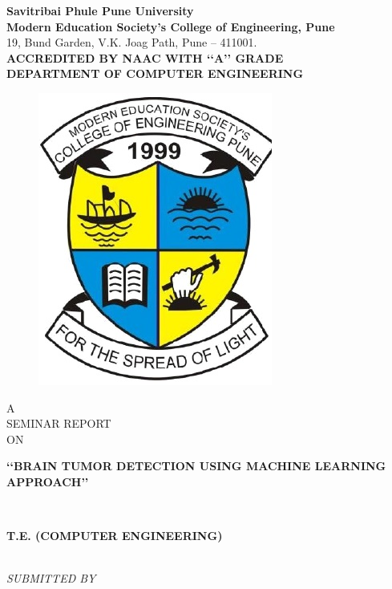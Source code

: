 \documentclass[a4paper, 12pt]{report}
\begin{document}
\newenvironment{frontmatter}{}{}
\begin{frontmatter}
\begin{titlepage}
\begin{center}
\textup{\large  \textbf{Savitribai Phule Pune University}\\\textbf{Modern Education Society\rq s College of Engineering, Pune}}\\19, Bund Garden, V.K. Joag Path, Pune – 411001. \\[0.2cm]\textbf{ACCREDITED BY NAAC WITH {\lq\lq A\rq\rq} GRADE}\\[0.2cm]\textbf{\large DEPARTMENT OF COMPUTER ENGINEERING}
\begin{center}
\begin{figure}[h]  %
\centering
\includegraphics[width=0.3\linewidth]{./logo1}
\end{figure}
\end{center}
\textup{\large  A \\ [0.4cm] SEMINAR REPORT\\[0.4cm]ON}\\[0.4cm]
\begin{LARGE}
{\textbf {\lq\lq BRAIN TUMOR DETECTION USING\vspace*{0.1in} MACHINE LEARNING APPROACH\rq\rq}}\end{LARGE}\\[1.2cm]
\begin{large}\textbf {T.E. (COMPUTER ENGINEERING)}
\end{large}\\[1cm]
\textit{SUBMITTED BY}\\[0.5cm]


\end{center}
\end{titlepage}
\end{frontmatter}
\end{document}
